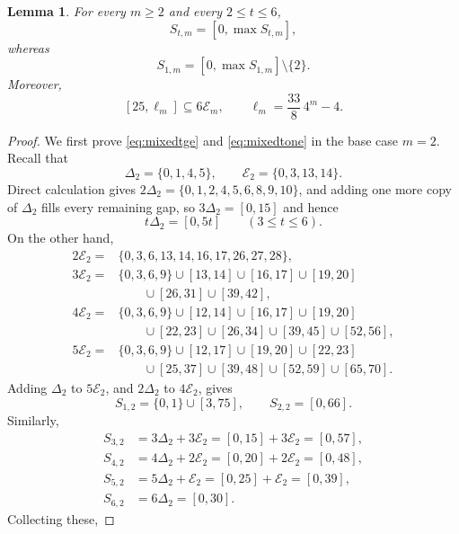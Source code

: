 \documentclass[12pt]{article}
\theoremstyle{plain}
\newtheorem{lemma}[theorem]{Lemma}
\theoremstyle{definition}
\theoremstyle{plain}
\begin{document}
\begin{lemma}\label{lem:mixed}
For every $m\geq2$ and every $2\leq t\leq6$,
\begin{equation}\label{eq:mixedtge}
 S_{t,m}=[0,\max S_{t,m}],
\end{equation}
whereas
\begin{equation}\label{eq:mixedtone}
 S_{1,m}=[0,\max S_{1,m}]\setminus\{2\}.
\end{equation}
Moreover,
\begin{equation}\label{eq:mixedEminterval}
 [25,\ell_{m}]\subseteq6\mathcal E_{m},\qquad \ell_{m}=\frac{33}{8}\,4^m-4 .
\end{equation}
\end{lemma}

\begin{proof}
We first prove \eqref{eq:mixedtge} and \eqref{eq:mixedtone} in the base
case $m=2$.  Recall that
\[
 \Delta_2=\{0,1,4,5\},\qquad \mathcal E_2=\{0,3,13,14\}.
\]
Direct calculation gives $2\Delta_2=\{0,1,2,4,5,6,8,9,10\}$, and adding one
more copy of $\Delta_2$ fills every remaining gap, so $3\Delta_2=[0,15]$ and hence
\[
 t\Delta_2=[0,5t]\qquad(3\leq t\leq6).
\]
On the other hand,
\[
\begin{aligned}
2\mathcal E_2
={}&\{0,3,6,13,14,16,17,26,27,28\},\\[1ex]
3\mathcal E_2
={}&\{0,3,6,9\}\cup[13,14]\cup[16,17]\cup[19,20]\\
&\qquad\cup[26,31]\cup[39,42],\\[1ex]
4\mathcal E_2
={}&\{0,3,6,9\}\cup[12,14]\cup[16,17]\cup[19,20]\\
&\qquad\cup[22,23]\cup[26,34]\cup[39,45]\cup[52,56],\\[1ex]
5\mathcal E_2
={}&\{0,3,6,9\}\cup[12,17]\cup[19,20]\cup[22,23]\\
&\qquad\cup[25,37]\cup[39,48]\cup[52,59]\cup[65,70].
\end{aligned}
\]
Adding $\Delta_2$ to $5\mathcal E_2$, and $2\Delta_2$ to $4\mathcal E_2$, gives
\[
 S_{1,2}=\{0,1\}\cup[3,75],\qquad S_{2,2}=[0,66].
\]
Similarly,
\[
\begin{aligned}
S_{3,2}&=3\Delta_2+3\mathcal E_2=[0,15]+3\mathcal E_2=[0,57],\\[1ex]
S_{4,2}&=4\Delta_2+2\mathcal E_2=[0,20]+2\mathcal E_2=[0,48],\\[1ex]
S_{5,2}&=5\Delta_2+\mathcal E_2 =[0,25]+\mathcal E_2 =[0,39],\\[1ex]
S_{6,2}&=6\Delta_2=[0,30].
\end{aligned}
\]
Collecting these,

\end{proof}
\end{document}
